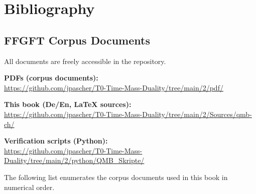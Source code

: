 \chapter*{Bibliography}

\section*{FFGFT Corpus Documents}

All documents are freely accessible in the repository.

\medskip\noindent\textbf{PDFs (corpus documents):}\\
\url{https://github.com/jpascher/T0-Time-Mass-Duality/tree/main/2/pdf/}

\medskip\noindent\textbf{This book (De/En, LaTeX sources):}\\
\url{https://github.com/jpascher/T0-Time-Mass-Duality/tree/main/2/Sources/qmb-ch/}

\medskip\noindent\textbf{Verification scripts (Python):}\\
\url{https://github.com/jpascher/T0-Time-Mass-Duality/tree/main/2/python/QMB_Skripte/}

\medskip\noindent The following list enumerates the corpus documents
used in this book in numerical order.

